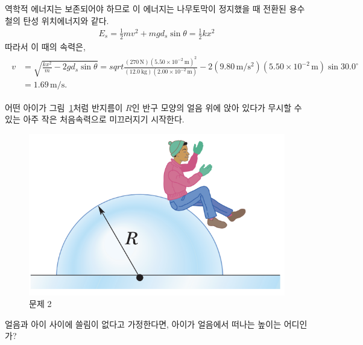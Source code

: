 \documentclass[floatfix,nofootinbib,superscriptaddress,fleqn]{revtex4-2}
\begin{document}
\begin{itemize}
  역학적 에너지는 보존되어야 하므로 이 에너지는 나무토막이 정지했을 때 
  전환된 용수철의 탄성 위치에너지와 같다.
  \begin{align}
    E_s = \frac{1}{2}mv^2+mgd_s\sin{\theta} = \frac{1}{2}kx^2
  \end{align}
  따라서 이 때의 속력은,
  \begin{align}
    \begin{split}
      v &= \sqrt{\frac{kx^2}{m}-2gd_s\sin{\theta}}
      =sqrt{\frac{(270\,\mathrm{N})\left(5.50\times 10^{-2}\,\mathrm{m}\right)^2}
      {(12.0\,\mathrm{kg})
      (2.00\times 10^{-2}\,\mathrm{m})}-2(9.80\,\mathrm{m/s^2})
      (5.50\times 10^{-2}\,\mathrm{m})\sin{30.0^\circ}} \\
      &= 1.69\,\mathrm{m/s}.
    \end{split}
  \end{align}
\end{itemize}

\vspace{3cm}

어떤 아이가 그림~\ref{fig:2}처럼
반지름이 $R$인 반구 모양의 얼음 위에 앉아 있다가 무시할 수 있는 아주
작은 처음속력으로 미끄러지기 시작한다. 
\begin{figure}[ht]
  \centering
\includegraphics[scale=0.5]{Qfig9-3-20210330.png}  
  \caption{문제 2}
  \label{fig:2}
\end{figure}
얼음과 아이 사이에 쓸림이 없다고 가정한다면, 아이가 얼음에서 떠나는
높이는 어디인가?
\end{document}
